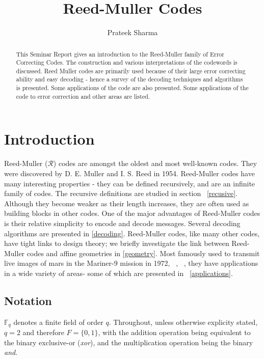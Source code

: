 \documentclass{article}
\title{Reed-Muller Codes}
\author{Prateek Sharma}
\newcommand{\F}{\ensuremath{\mathbb{F}}}
\theoremstyle{plain}
\begin{document}
\maketitle

\begin{abstract} 
This Seminar Report gives an introduction to the Reed-Muller family of Error Correcting Codes. The construction and various interpretations of the codewords is discussed. Reed Muller codes are primarily used because of their large error correcting ability and easy decoding - hence a survey of the decoding techniques and algorithms is presented. Some applications of the code are also presented. Some applications of the code to error correction and other areas are listed.
\end{abstract}


\section {Introduction}


Reed-Muller ($\mathcal{R}$) codes are amongst the oldest and most well-known codes. They were discovered by D. E. Muller and I. S. Reed in 1954. \cite{reed} \cite{muller}
Reed-Muller codes have many interesting properties - they can be defined recursively, and are an infinite family of codes. The recursive definitions are studied in section ~\ref{recusive}.
Although they become weaker as their length increases, they are often used as building blocks in other codes. One of the major advantages of Reed-Muller codes is their relative simplicity to encode and decode messages. Several decoding algorithms are presented in \ref{decoding}.  Reed-Muller codes, like many other codes, have tight links to design theory; we briefly investigate the link between Reed-Muller codes and affine geometries in \ref{geometry}.
Most famously used to transmit live images of mars in the Mariner-9 mission in 1972, ~\cite{space},~\cite{sloane} , they have applications in a wide variety of areas- some of which are presented in ~\ref{applications}.


\subsection {Notation}
\label{notation}


$\F{} _q$ denotes a finite field of order $q$.
Throughout, unless otherwise explicity stated, $q=2$ and therefore $F=\{0,1\}$, with the addition operation being equivalent to the binary exclusive-or (\emph{xor}), and the multiplication operation being the binary \emph{and}.
\end{document}
